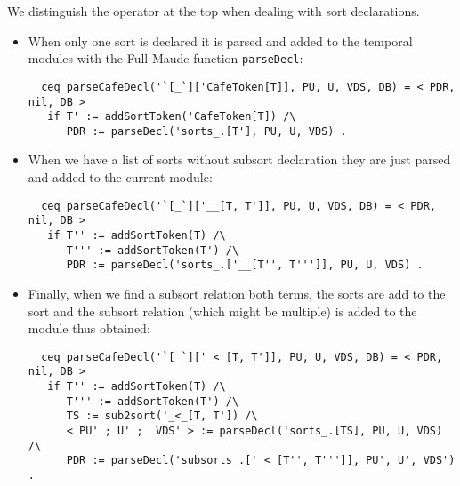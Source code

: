 We distinguish the operator at the top when dealing with sort declarations.
\begin{itemize}
\item
When only one sort is declared it is parsed and added to the temporal
modules with the Full Maude function \verb"parseDecl":

{\codesize
\begin{verbatim}
  ceq parseCafeDecl('`[_`]['CafeToken[T]], PU, U, VDS, DB) = < PDR, nil, DB >
   if T' := addSortToken('CafeToken[T]) /\
      PDR := parseDecl('sorts_.[T'], PU, U, VDS) .
\end{verbatim}
}

\item
When we have a list of sorts without subsort declaration they are just parsed
and added to the current module:

{\codesize
\begin{verbatim}
  ceq parseCafeDecl('`[_`]['__[T, T']], PU, U, VDS, DB) = < PDR, nil, DB >
   if T'' := addSortToken(T) /\
      T''' := addSortToken(T') /\
      PDR := parseDecl('sorts_.['__[T'', T''']], PU, U, VDS) .
\end{verbatim}
}

\item
Finally, when we find a subsort relation both terms, the sorts are add to the
sort and the subsort relation (which might be multiple) is added to the module
thus obtained:

{\codesize
\begin{verbatim}
  ceq parseCafeDecl('`[_`]['_<_[T, T']], PU, U, VDS, DB) = < PDR, nil, DB >
   if T'' := addSortToken(T) /\
      T''' := addSortToken(T') /\
      TS := sub2sort('_<_[T, T']) /\
      < PU' ; U' ;  VDS' > := parseDecl('sorts_.[TS], PU, U, VDS) /\
      PDR := parseDecl('subsorts_.['_<_[T'', T''']], PU', U', VDS') .
\end{verbatim}
}

\end{itemize}

